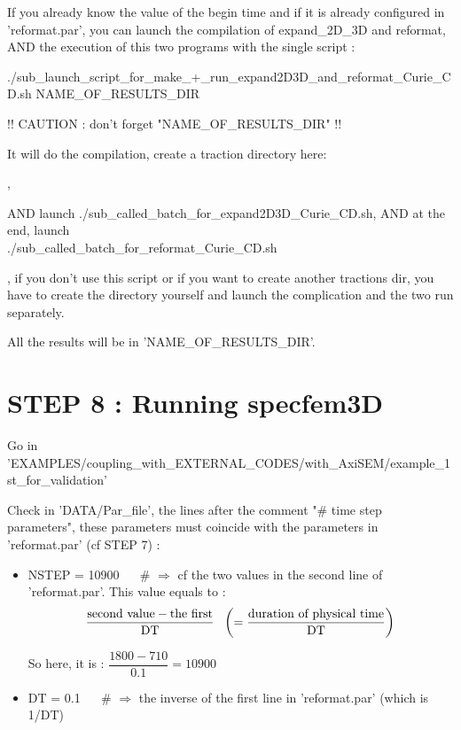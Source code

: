 \documentclass[11pt]{article}
\newcommand{\ds}{\displaystyle}
\begin{document}
\bigskip

 If you already know the value of the begin time and if it is already configured in 'reformat.par', you can launch the compilation of expand\_2D\_3D and reformat, AND the execution of this two programs with the single script :

\medskip

\noindent ./sub\_launch\_script\_for\_make\_+\_run\_expand2D3D\_and\_reformat\_Curie\_CD.sh NAME\_OF\_RESULTS\_DIR

\medskip

\noindent !! CAUTION : don't forget "NAME\_OF\_RESULTS\_DIR" !!

\bigskip

\noindent It will do the compilation, create a traction directory here:

,

\smallskip

\noindent AND launch ./sub\_called\_batch\_for\_expand2D3D\_Curie\_CD.sh, AND at the end, launch \\
\noindent ./sub\_called\_batch\_for\_reformat\_Curie\_CD.sh

\medskip

, if you don't use this script or if you want to create another tractions dir, you have to create the directory yourself and launch the complication and the two run separately.

\bigskip

\noindent All the results will be in 'NAME\_OF\_RESULTS\_DIR'.


\section{STEP 8 : Running specfem3D}

\noindent Go in 'EXAMPLES/coupling\_with\_EXTERNAL\_CODES/with\_AxiSEM/example\_1st\_for\_validation'

\medskip

\noindent Check in 'DATA/Par\_file', the lines after the comment "\# time step parameters", these parameters must coincide with the parameters in  'reformat.par' (cf STEP 7) :

\begin{itemize}

\item[\textbullet] NSTEP = 10900 ~~ \# $\Longrightarrow$ cf the two values in the second line of 'reformat.par'. This value equals to :
$$\ds \dfrac{\hbox{second value} - \hbox{the first}}{\text{DT}} ~~ \left(= \dfrac{\hbox{duration of physical time}}{\text{DT}} \right)$$

\noindent So here, it is : $\ds \dfrac{1800 - 710}{0.1} = 10900$

\medskip

\item[\textbullet] DT = 0.1 ~~ \# $\Longrightarrow$ the inverse of the first line in 'reformat.par' (which is 1/DT)

\end{itemize}
\end{document}
